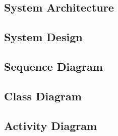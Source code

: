 \subsection{System Architecture}
\newpage

\subsection{System Design}
\newpage


\newpage

\subsection{Sequence Diagram}
\newpage


\subsection{Class Diagram}
\newpage



\newpage


\subsection{Activity Diagram}
\newpage




\newpage




\newpage


\newpage



